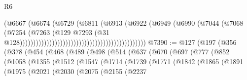 \begin{lexlean}{R6}
\begin{coremodule}
                                                                      (@6667
                                                                        (@6674
                                                                          (@6729
                                                                            (@6811
                                                                              (@6913
                                                                                (@6922
                                                                                  (@6949
                                                                                    (@6990
                                                                                      (@7044
                                                                                        (@7068
                                                                                          (@7254
                                                                                            (@7263
                                                                                              (@129
                                                                                                @7293
                                                                                                (@31
                                                                                                  @128)))))))))))))))))))))))))))))))))))))))))))))))
@7390 := @127
    (@197
      (@356
        (@378
          (@454
            (@468
              (@489
                (@498
                  (@514
                    (@637
                      (@670
                        (@697
                          (@777
                            (@852
                              (@1058
                                (@1355
                                  (@1512
                                    (@1547
                                      (@1714
                                        (@1739
                                          (@1771
                                            (@1842
                                              (@1865
                                                (@1891
                                                  (@1975
                                                    (@2021
                                                      (@2030
                                                        (@2075
                                                          (@2155
                                                            (@2237

\end{coremodule}
\end{lexlean}
